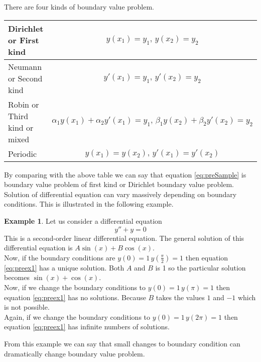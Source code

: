 \documentclass[12pt,a4paper]{article}
\theoremstyle{remark}
\theoremstyle{definition}
\newtheorem{ex}{Example}[section]
\begin{document}
There are four kinds of boundary value problem.
\begin{table}[H]
    \renewcommand{\arraystretch}{1.5}
    \centering
    \begin{tabular}{|l|c|}
        \hline
        Dirichlet or First kind      & $ y(x_1)=y_1,\,y(x_2)=y_2 $                                                 \\\hline
        Neumann or Second kind       & $ y'(x_1)=y_1,\,y'(x_2)=y_2 $                                               \\\hline
        Robin or Third kind or mixed & $ \alpha_1y(x_1)+\alpha_2y'(x_1)=y_1,\,\beta_1y(x_2)+\beta_2y'(x_2)=y_2 $ \\\hline
        Periodic                     & $ y(x_1)=y(x_2),\,y'(x_1)=y'(x_2)$                                          \\\hline
    \end{tabular}
\end{table}
By comparing with the above table we can say that equation \eqref{eq:preSample} is boundary value problem of first kind or Dirichlet boundary value problem.\\
Solution of differential equation can vary massively depending on boundary conditions. This is illustrated in the following example.
\begin{ex}
    Let us consider a differential equation
    \begin{equation}
        \label{eq:preex1}
        y''+y=0
    \end{equation}
    This is a second-order linear differential equation. The general solution of this differential equation is $ A\sin (x)+B \cos (x) $.\\

    Now, if the boundary conditions are $ y(0)=1\, y\left( \frac{\pi}{2} \right)=1 $ then equation \eqref{eq:preex1} has a unique solution. Both $ A $ and $ B $ is 1 so the particular solution becomes $ \sin(x)+\cos(x) $.\\

    Now, if we change the boundary conditions to $ y(0)=1\, y( \pi)=1 $ then equation \eqref{eq:preex1} has no solutions. Because $ B $ takes the values $ 1 $ and $ -1 $ which is not possible.\\

    Again, if we change the boundary conditions to $ y(0)=1\, y( 2\pi)=1 $ then equation \eqref{eq:preex1} has infinite numbers of solutions.
\end{ex}
From this example we can say that small changes to boundary condition can dramatically change boundary value problem.
\end{document}
